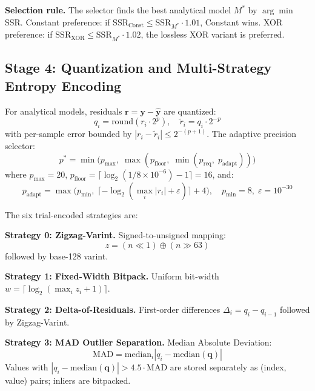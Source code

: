 \documentclass[runningheads]{llncs}
\begin{document}
\textbf{Selection rule.} The selector finds the best analytical model $M^*$ by $\arg\min$ SSR. Constant preference: if $\text{SSR}_{\text{Const}} \le \text{SSR}_{M^*} \cdot 1.01$, Constant wins. XOR preference: if $\text{SSR}_{\text{XOR}} \le \text{SSR}_{M^*} \cdot 1.02$, the lossless XOR variant is preferred.

\subsection{Stage 4: Quantization and Multi-Strategy Entropy Encoding}

For analytical models, residuals $\mathbf{r} = \mathbf{y} - \hat{\mathbf{y}}$ are quantized:
\begin{equation}
\label{eq:quant}
q_i = \text{round}(r_i \cdot 2^p), \quad \tilde{r}_i = q_i \cdot 2^{-p}
\end{equation}
with per-sample error bounded by $|r_i - \tilde{r}_i| \le 2^{-(p+1)}$. The adaptive precision selector:
\begin{equation}
\label{eq:prec}
p^* = \min\!\big(p_{\max},\; \max(p_{\text{floor}},\; \min(p_{\text{req}},\; p_{\text{adapt}}))\big)
\end{equation}
where $p_{\max} = 20$, $p_{\text{floor}} = \lceil \log_2(1 / 8 \times 10^{-6}) - 1 \rceil = 16$, and:
\begin{equation}
\label{eq:padapt}
p_{\text{adapt}} = \max\!\big(p_{\min},\; \lceil -\log_2(\max_i |r_i| + \varepsilon) \rceil + 4\big), \quad p_{\min} = 8,\; \varepsilon = 10^{-30}
\end{equation}

The six trial-encoded strategies are:

\textbf{Strategy 0: Zigzag-Varint.} Signed-to-unsigned mapping:
\begin{equation}
\label{eq:zigzag}
z = (n \ll 1) \oplus (n \gg 63)
\end{equation}
followed by base-128 varint.

\textbf{Strategy 1: Fixed-Width Bitpack.} Uniform bit-width $w = \lceil \log_2(\max_i z_i + 1) \rceil$.

\textbf{Strategy 2: Delta-of-Residuals.} First-order differences $\Delta_i = q_i - q_{i-1}$ followed by Zigzag-Varint.

\textbf{Strategy 3: MAD Outlier Separation.} Median Absolute Deviation:
\begin{equation}
\label{eq:mad}
\text{MAD} = \text{median}_i |q_i - \text{median}(\mathbf{q})|
\end{equation}
Values with $|q_i - \text{median}(\mathbf{q})| > 4.5 \cdot \text{MAD}$ are stored separately as (index, value) pairs; inliers are bitpacked.
\end{document}
